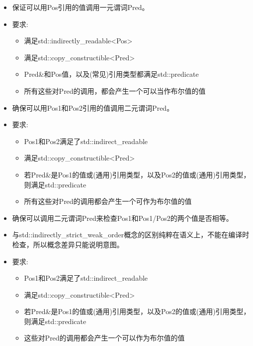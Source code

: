 \begin{itemize}
\item
保证可以用Pos引用的值调用一元谓词Pred。

\item
要求:
\begin{itemize}
\item
满足std::indirectly\_readable<Pos>

\item
满足std::copy\_constructible<Pred>

\item
Pred\&和Pos值，以及(常见)引用类型都满足std::predicate

\item
所有这些对Pred的调用，都会产生一个可以当作布尔值的值
\end{itemize}
\end{itemize}


\begin{itemize}
\item
确保可以用Pos1和Pos2引用的值调用二元谓词Pred。

\item
要求:
\begin{itemize}
\item
Pos1和Pos2满足了std::indirect\_readable

\item
满足std::copy\_constructible<Pred>

\item
若Pred\&是Pos1的值或(通用)引用类型，以及Pos2的值或(通用)引用类型，则满足std::predicate

\item
所有这些对Pred的调用都会产生一个可作为布尔值的值
\end{itemize}
\end{itemize}


\begin{itemize}
\item
确保可以调用二元谓词Pred来检查Pos1和Pos1/Pos2的两个值是否相等。

\item
与std::indirectly\_strict\_weak\_order概念的区别纯粹在语义上，不能在编译时检查，所以概念差异只能说明意图。

\item
要求:
\begin{itemize}
\item
Pos1和Pos2满足了std::indirect\_readable

\item
满足std::copy\_constructible<Pred>

\item
若Pred\&是Pos1的值或(通用)引用类型，以及Pos2的值或(通用)引用类型，则满足std::predicate

\item
这些对Pred的调用都会产生一个可以作为布尔值的值
\end{itemize}
\end{itemize}

